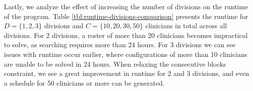 Lastly, we analyze the effect of increasing the number of divisions on the runtime of the program. Table \ref{tbl:runtime-divisions-comparison} presents the runtime for $D = \{1, 2, 3\}$ divisions and $C = \{10, 20, 30, 50\}$ clinicians in total across all divisions. For 2 divisions, a roster of more than 20 clinicians becomes impractical to solve, as searching requires more than 24 hours. For 3 divisions we can see issues with runtime occur earlier, where configurations of more than 10 clinicians are unable to be solved in 24 hours. When relaxing the consecutive blocks constraint, we see a great improvement in runtime for 2 and 3 divisions, and even a schedule for 50 clinicians or more can be generated. 




